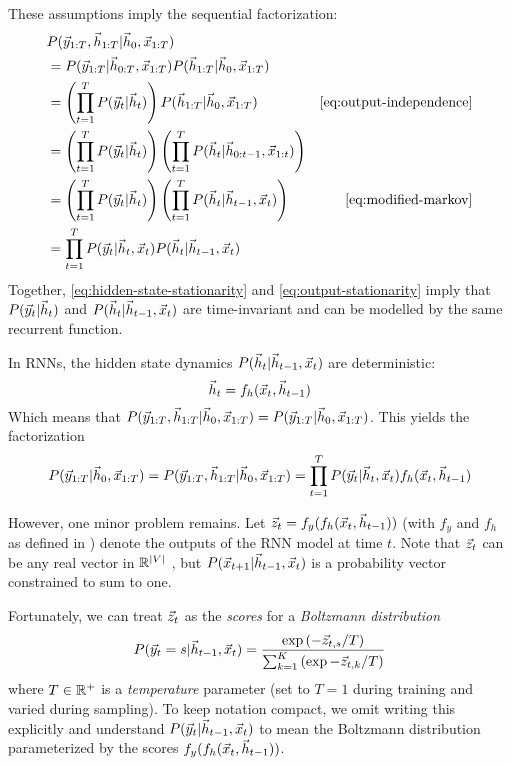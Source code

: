 These assumptions imply the sequential factorization:
\begin{align}
  &P(\y_{1:T}, \h_{1:T} | \h_0, \x_{1:T})  &\\
  &= P(\y_{1:T} | \h_{0:T}, \x_{1:T}) P(\h_{1:T} | \h_0, \x_{1:T})  &\\
  &= \left( \prod_{t=1}^T P(\y_t | \h_t) \right) P(\h_{1:T}| \h_0, \x_{1:T}) &\text{\cref{eq:output-independence}}\\
  &= \left( \prod_{t=1}^T P(\y_t | \h_t) \right) \left(\prod_{t=1}^T P(\h_{t}| \h_{0:t-1}, \x_{1:t})\right) &\\
  &= \left( \prod_{t=1}^T P(\y_t | \h_t) \right) \left(\prod_{t=1}^T P(\h_{t}| \h_{t-1}, \x_{t})\right) &\text{\cref{eq:modified-markov}}\\
  &= \prod_{t=1}^T P(\y_t | \h_t, \x_t) P(\h_{t}| \h_{t-1}, \x_{t}) & \\
\end{align}
Together, \cref{eq:hidden-state-stationarity} and \cref{eq:output-stationarity} imply that $P(\vec{y}_t | \vec{h}_t)$
and $P(\vec{h}_{t}| \vec{h}_{t-1}, \vec{x}_{t})$ are time-invariant and can be modelled by the same recurrent function.

In RNNs, the hidden state dynamics $P(\vec{h}_t | \vec{h}_{t-1}, \vec{x}_t)$ are deterministic:
\begin{equation}
  \vec{h}_t = f_h(\vec{x}_t, \vec{h}_{t-1})
\end{equation}
Which means that $P(\vec{y}_{1:T}, \vec{h}_{1:T} | \vec{h}_0, \vec{x}_{1:T}) = P(\vec{y}_{1:T} | \vec{h}_0, \vec{x}_{1:T})$.
This yields the factorization
\begin{equation}
  P(\vec{y}_{1:T} | \vec{h}_0, \vec{x}_{1:T})
  = P(\vec{y}_{1:T}, \vec{h}_{1:T} | \vec{h}_0, \vec{x}_{1:T})
  = \prod_{t=1}^T P(\vec{y}_t | \vec{h}_t, \vec{x}_t) f_h(\vec{x}_t, \vec{h}_{t-1})
\end{equation}

However, one minor problem remains. Let $\vec{z}_t = f_y(f_h(\vec{x}_t, \vec{h}_{t-1}))$ (with
$f_y$ and $f_h$ as defined in ) denote the outputs of the RNN model
at time $t$. Note that $\vec{z}_t$ can be any real vector in $\mathbb{R}^{|V|}$
, but $P(\vec{x}_{t+1} | \vec{h}_{t-1}, \vec{x}_{t})$ is
a probability vector constrained to sum to one.

Fortunately, we can treat $\vec{z}_t$ as the \emph{scores} for a \emph{Boltzmann
distribution}
\begin{equation}\label{eq:boltzmann-dist}
    P( \vec{y}_{t} = s | \vec{h}_{t-1}, \vec{x}_t )
    = \frac{\exp \left(-\vec{z}_{t,s}/T\right) }{ \sum_{k=1}^{K} \left(\exp -\vec{z}_{t,k}/T\right)}
\end{equation}
where $T \in \mathbb{R}^+$ is a \emph{temperature} parameter (set to $T=1$ during training and varied during sampling).
To keep notation compact, we omit writing this explicitly and understand $P(\vec{y}_t | \vec{h}_{t-1}, \vec{x}_t)$ to mean
the Boltzmann distribution parameterized by the scores $f_y(f_h(\vec{x}_t, \vec{h}_{t-1}))$.

